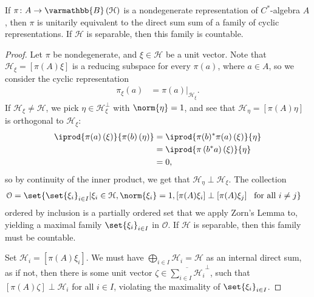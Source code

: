 \documentclass[10pt]{mypackage}
\renewcommand*{\mathbb}[1]{\varmathbb{#1}}
\newcommand{\B}{\mathbb{B}}
\begin{document}
\begin{lemma}
  If $\pi\colon A\rightarrow \B\left(\mathcal{H}\right)$ is a nondegenerate representation of $C^{\ast}$-algebra $A$, then $\pi$ is unitarily equivalent to the direct sum sum of a family of cyclic representations. If $\mathcal{H}$ is separable, then this family is countable.
\end{lemma}
\begin{proof}
  Let $\pi$ be nondegenerate, and $\xi\in \mathcal{H}$ be a unit vector. Note that $\mathcal{H}_{\xi} = \left[\pi(A)\xi\right]$ is a reducing subspace for every $\pi(a)$, where $a\in A$, so we consider the cyclic representation
  \begin{align*}
    \pi_{\xi}\left(a\right) &= \pi(a)|_{\mathcal{H}_{\xi}}.
  \end{align*}
  If $\mathcal{H}_{\xi}\neq \mathcal{H}$, we pick $\eta\in \mathcal{H}_{\xi}^{\perp}$ with $\norm{\eta} = 1$, and see that $\mathcal{H}_{\eta} = \left[\pi(A)\eta\right]$ is orthogonal to $\mathcal{H}_{\xi}$:
  \begin{align*}
    \iprod{\pi(a)\left(\xi\right)}{\pi(b)\left(\eta\right)} &= \iprod{\pi(b)^{\ast}\pi(a)\left(\xi\right)}{\eta}\\
                                                            &= \iprod{\pi\left(b^{\ast}a\right)\left(\xi\right)}{\eta}\\
                                                            &= 0,
  \end{align*}
  so by continuity of the inner product, we get that $\mathcal{H}_{\eta}\perp \mathcal{H}_{\xi}$. The collection
  \begin{align*}
    \mathcal{O} &= \set{\set{\xi_{i}}_{i\in I} | \xi_i\in \mathcal{H},\norm{\xi_i} = 1,\left[\pi(A)\xi_i\right]\perp \left[\pi(A)\xi_j\right]~\text{ for all }i\neq j}
  \end{align*}
  ordered by inclusion is a partially ordered set that we apply Zorn's Lemma to, yielding a maximal family $\set{\xi_i}_{i\in I}$ in $\mathcal{O}$. If $\mathcal{H}$ is separable, then this family must be countable.\newline

  Set $\mathcal{H}_i = \left[\pi(A)\xi_i\right]$. We must have $\bigoplus_{i\in I}\mathcal{H}_i = \mathcal{H}$ as an internal direct sum, as if not, then there is some unit vector $\zeta \in \overline{\sum_{i\in I}\mathcal{H}_i}^{\perp}$, such that $\left[\pi(A)\zeta\right]\perp \mathcal{H}_i$ for all $i\in I$, violating the maximality of $\set{\xi_i}_{i\in I}$.\newline


\end{proof}
\end{document}

